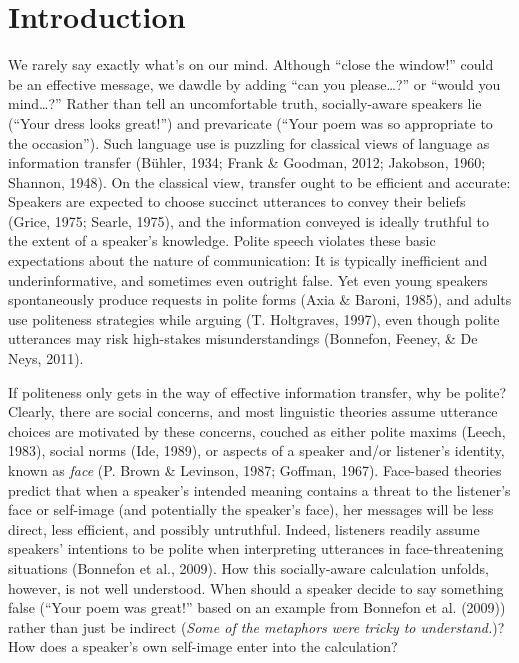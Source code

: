 \documentclass[oneside]{report}
\begin{document}
\section{Introduction}\label{introduction-3}

We rarely say exactly what's on our mind. Although ``close the window!''
could be an effective message, we dawdle by adding ``can you
please\ldots{}?'' or ``would you mind\ldots{}?'' Rather than tell an
uncomfortable truth, socially-aware speakers lie (``Your dress looks
great!'') and prevaricate (``Your poem was so appropriate to the
occasion''). Such language use is puzzling for classical views of
language as information transfer (Bühler, 1934; Frank \& Goodman, 2012;
Jakobson, 1960; Shannon, 1948). On the classical view, transfer ought to
be efficient and accurate: Speakers are expected to choose succinct
utterances to convey their beliefs (Grice, 1975; Searle, 1975), and the
information conveyed is ideally truthful to the extent of a speaker's
knowledge. Polite speech violates these basic expectations about the
nature of communication: It is typically inefficient and
underinformative, and sometimes even outright false. Yet even young
speakers spontaneously produce requests in polite forms (Axia \& Baroni,
1985), and adults use politeness strategies while arguing (T.
Holtgraves, 1997), even though polite utterances may risk high-stakes
misunderstandings (Bonnefon, Feeney, \& De Neys, 2011).

If politeness only gets in the way of effective information transfer,
why be polite? Clearly, there are social concerns, and most linguistic
theories assume utterance choices are motivated by these concerns,
couched as either polite maxims (Leech, 1983), social norms (Ide, 1989),
or aspects of a speaker and/or listener's identity, known as \emph{face}
(P. Brown \& Levinson, 1987; Goffman, 1967). Face-based theories predict
that when a speaker's intended meaning contains a threat to the
listener's face or self-image (and potentially the speaker's face), her
messages will be less direct, less efficient, and possibly untruthful.
Indeed, listeners readily assume speakers' intentions to be polite when
interpreting utterances in face-threatening situations (Bonnefon et al.,
2009). How this socially-aware calculation unfolds, however, is not well
understood. When should a speaker decide to say something false (``Your
poem was great!'' based on an example from Bonnefon et al. (2009))
rather than just be indirect
(\emph{Some of the metaphors were tricky to understand.})? How does a
speaker's own self-image enter into the calculation?
\end{document}
